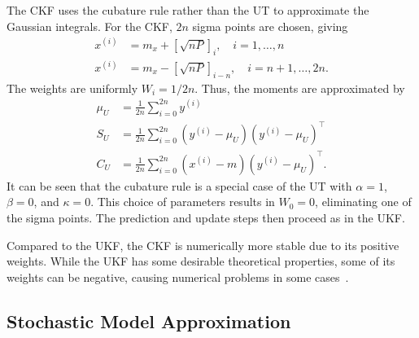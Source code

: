 \documentclass[../zhang_thesis.tex]{subfiles}
\begin{document}
The CKF uses the cubature rule rather than the UT to approximate the Gaussian integrals. For the CKF, $2n$ sigma points are chosen, giving
\begin{align}
    x^{(i)} & = m_x + \left[ \sqrt{nP} \right]_i, \quad i=1,\dots,n \\
    x^{(i)} & = m_x - \left[ \sqrt{nP} \right]_{i-n}, \quad i=n+1,\dots,2n.
\end{align}
The weights are uniformly $W_i=1/2n$. Thus, the moments are approximated by
\begin{align}
    \mu_U & = \frac{1}{2n} \sum_{i=0}^{2n} y^{(i)} \\
    S_U & = \frac{1}{2n} \sum_{i=0}^{2n} ( y^{(i)} - \mu_U ) ( y^{(i)} - \mu_U )^\top \\
    C_U & = \frac{1}{2n} \sum_{i=0}^{2n} ( x^{(i)} - m ) ( y^{(i)} - \mu_U )^\top.
\end{align}
It can be seen that the cubature rule is a special case of the UT with $\alpha=1$, $\beta=0$, and $\kappa=0$. This choice of parameters results in $W_0=0$, eliminating one of the sigma points. The prediction and update steps then proceed as in the UKF.

Compared to the UKF, the CKF is numerically more stable due to its positive weights. While the UKF has some desirable theoretical properties, some of its weights can be negative, causing numerical problems in some cases~\cite{sarkka12}.

\subsection{Stochastic Model Approximation}
\end{document}
